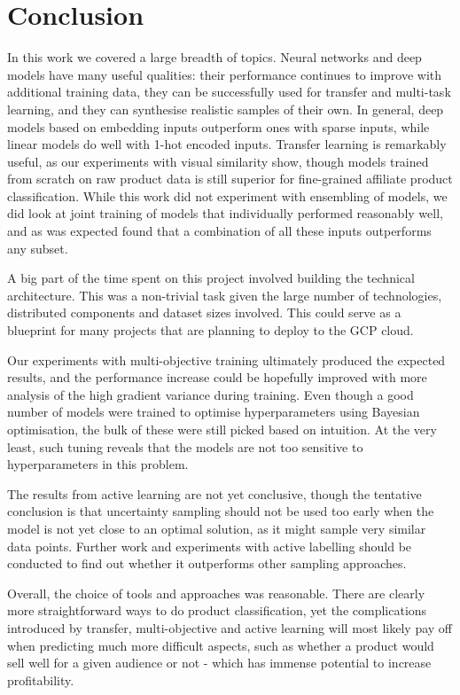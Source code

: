 \chapter{Conclusion}
\label{sum}

In this work we covered a large breadth of topics.
Neural networks and deep models have many useful qualities: their performance continues to improve with additional training data, they can be successfully used for transfer and multi-task learning, and they can synthesise realistic samples of their own.
In general, deep models based on embedding inputs outperform ones with sparse inputs, while linear models do well with 1-hot encoded inputs.
Transfer learning is remarkably useful, as our experiments with visual similarity show, though models trained from scratch on raw product data is still superior for fine-grained affiliate product classification.
While this work did not experiment with ensembling of models, we did look at joint training of models that individually performed reasonably well, and as was expected found that a combination of all these inputs outperforms any subset.

A big part of the time spent on this project involved building the technical architecture.
This was a non-trivial task given the large number of technologies, distributed components and dataset sizes involved.
This could serve as a blueprint for many projects that are planning to deploy to the GCP cloud.

Our experiments with multi-objective training ultimately produced the expected results, and the performance increase could be hopefully improved with more analysis of the high gradient variance during training.
Even though a good number of models were trained to optimise hyperparameters using Bayesian optimisation, the bulk of these were still picked based on intuition.
At the very least, such tuning reveals that the models are not too sensitive to hyperparameters in this problem.

The results from active learning are not yet conclusive, though the tentative conclusion is that uncertainty sampling should not be used too early when the model is not yet close to an optimal solution, as it might sample very similar data points.
Further work and experiments with active labelling should be conducted to find out whether it outperforms other sampling approaches.

Overall, the choice of tools and approaches was reasonable.
There are clearly more straightforward ways to do product classification, yet the complications introduced by transfer, multi-objective and active learning will most likely pay off when predicting much more difficult aspects, such as whether a product would sell well for a given audience or not - which has immense potential to increase profitability.
